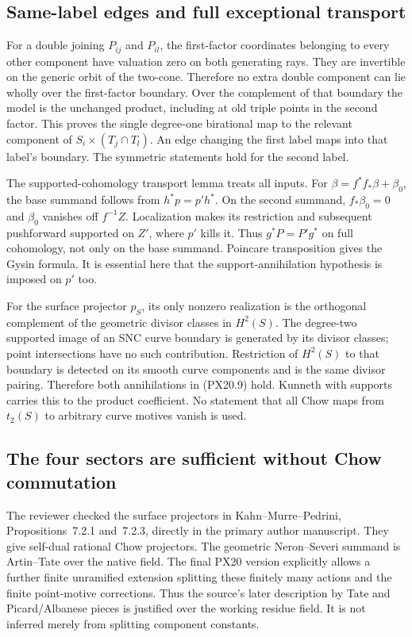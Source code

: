 \subsection{Same-label edges and full exceptional transport}

For a double joining $P_{ij}$ and $P_{il}$, the first-factor
coordinates belonging to every other component have valuation zero
on both generating rays. They are invertible on the generic orbit
of the two-cone. Therefore no extra double component can lie wholly
over the first-factor boundary. Over the complement of that boundary
the model is the unchanged product, including at old triple points
in the second factor. This proves the single degree-one birational
map to the relevant component of $S_i\times(T_j\cap T_l)$.
An edge changing the first label maps into that label's boundary.
The symmetric statements hold for the second label.

The supported-cohomology transport lemma treats all inputs. For
$\beta=f^*f_*\beta+\beta_0$, the base summand follows from
$h^*p=p'h^*$. On the second summand, $f_*\beta_0=0$ and
$\beta_0$ vanishes off $f^{-1}Z$. Localization makes its restriction
and subsequent pushforward supported on $Z'$, where $p'$ kills it.
Thus $g^*P=P'g^*$ on full cohomology, not only on the base summand.
Poincare transposition gives the Gysin formula. It is essential here
that the support-annihilation hypothesis is imposed on $p'$ too.

For the surface projector $p_S$, its only nonzero realization is the
orthogonal complement of the geometric divisor classes in $H^2(S)$.
The degree-two supported image of an SNC curve boundary is generated
by its divisor classes; point intersections have no such contribution.
Restriction of $H^2(S)$ to that boundary is detected on its smooth
curve components and is the same divisor pairing. Therefore both
annihilations in (PX20.9) hold. Kunneth with supports carries this to
the product coefficient. No statement that all Chow maps from
$t_2(S)$ to arbitrary curve motives vanish is used.

\subsection{The four sectors are sufficient without Chow commutation}

The reviewer checked the surface projectors in Kahn--Murre--Pedrini,
Propositions~7.2.1 and~7.2.3, directly in the primary author manuscript.
They give self-dual rational Chow projectors. The geometric
Neron--Severi summand is Artin--Tate over the native field. The final
PX20 version explicitly allows a further finite unramified extension
splitting these finitely many actions and the finite point-motive
corrections. Thus the source's later description by Tate and
Picard/Albanese pieces is justified over the working residue field.
It is not inferred merely from splitting component constants.

